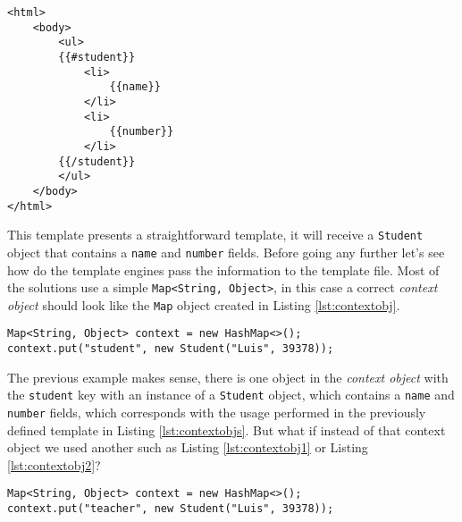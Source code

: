 \bigskip


\begin{minipage}{\linewidth}
\begin{lstlisting}[caption={Template with Placeholders}, label={lst:contextobjs}, style=problemex]
<html>
    <body>
        <ul>
        {{#student}}
            <li>
                {{name}}
            </li>
            <li>
                {{number}}
            </li>
        {{/student}}
        </ul>
    </body>
</html>
\end{lstlisting}
\end{minipage} 

\noindent
This template presents a straightforward template, it will receive a \texttt{Student} object that contains a \texttt{name} and \texttt{number} fields. Before going any further let's see how do the template engines pass the information to the template file. Most of the solutions use a simple \texttt{Map<String, Object>}, in this case a correct \textit{context object} should look like the \texttt{Map} object created in Listing \ref{lst:contextobj}.

\bigskip


\begin{minipage}{\linewidth}
\begin{lstlisting}[caption={Correct Context Object}, label={lst:contextobj}]
Map<String, Object> context = new HashMap<>();
context.put("student", new Student("Luis", 39378));
\end{lstlisting}
\end{minipage} 

\noindent
The previous example makes sense, there is one object in the \textit{context object} with the \texttt{student} key with an instance of a \texttt{Student} object, which contains a \texttt{name} and \texttt{number} fields, which corresponds with the usage performed in the previously defined template in Listing \ref{lst:contextobjs}. But what if instead of that context object we used another such as Listing \ref{lst:contextobj1} or Listing \ref{lst:contextobj2}?

\bigskip


\begin{minipage}{\linewidth}
\begin{lstlisting}[caption={Context Object With Errors - 1}, label={lst:contextobj1}]
Map<String, Object> context = new HashMap<>();
context.put("teacher", new Student("Luis", 39378));
\end{lstlisting}
\end{minipage} 

